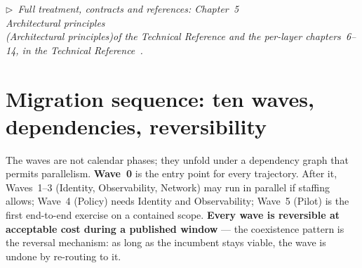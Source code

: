 \documentclass[11pt,a4paper,twoside]{article}
\newcommand{\keyword}[1]{\textbf{#1}}
\newcommand{\trchap}[2]{%
  Chapter~#1%
  \ifx\\#2\\\else\space(\emph{#2})\fi\space of the Technical Reference%
}
\newcommand{\mainref}[1]{%
  \par\vspace{1pt}
  {\footnotesize\color{gray}\itshape
  $\triangleright$~Full treatment, contracts and references: #1,
  in the Technical Reference~\cite{ng-tech-ref-2026}.}\par\vspace{2pt}}
\begin{document}
\mainref{\trchap{5}{Architectural principles} and the per-layer
chapters~6--14}

\section{Migration sequence: ten waves, dependencies, reversibility}

The waves are not calendar phases; they unfold under a dependency graph that
permits parallelism. \keyword{Wave~0} is the entry point for every
trajectory. After it, Waves~1--3 (Identity, Observability, Network) may run
in parallel if staffing allows; Wave~4 (Policy) needs Identity and
Observability; Wave~5 (Pilot) is the first end-to-end exercise on a contained
scope. \keyword{Every wave is reversible at acceptable cost during a published
window} --- the coexistence pattern is the reversal mechanism: as long as the
incumbent stays viable, the wave is undone by re-routing to it.
\end{document}
